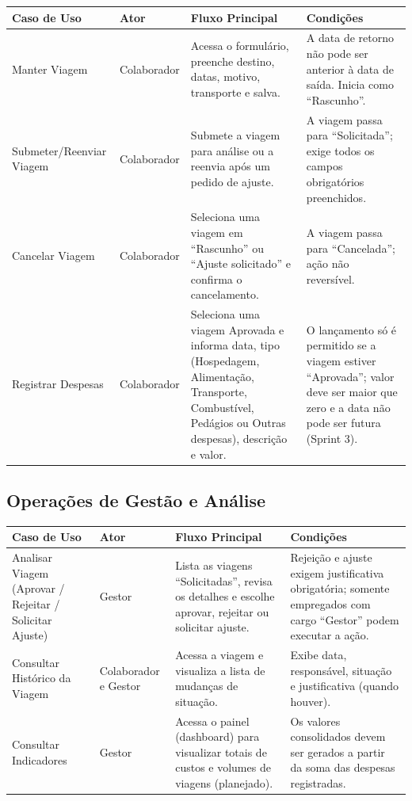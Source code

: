 \documentclass[12pt,article,oneside,a4paper]{abntex2}
\begin{document}
\begin{xltabular}{\textwidth}{|Y|l|Y|Y|}
\hline
{}
\textbf{Caso de Uso} & \textbf{Ator} & \textbf{Fluxo Principal} & \textbf{Condições} \\
\hline
\endhead
Manter Viagem & Colaborador & Acessa o formulário, preenche destino, datas, motivo, transporte e salva. & A data de retorno não pode ser anterior à data de saída. Inicia como ``Rascunho''. \\
\hline
Submeter/Reenviar Viagem & Colaborador & Submete a viagem para análise ou a reenvia após um pedido de ajuste. & A viagem passa para ``Solicitada''; exige todos os campos obrigatórios preenchidos. \\
\hline
Cancelar Viagem & Colaborador & Seleciona uma viagem em ``Rascunho'' ou ``Ajuste solicitado'' e confirma o cancelamento. & A viagem passa para ``Cancelada''; ação não reversível. \\
\hline
Registrar Despesas & Colaborador & Seleciona uma viagem Aprovada e informa data, tipo (Hospedagem, Alimentação, Transporte, Combustível, Pedágios ou Outras despesas), descrição e valor. & O lançamento só é permitido se a viagem estiver ``Aprovada''; valor deve ser maior que zero e a data não pode ser futura (Sprint 3). \\
\hline
\end{xltabular}

\bigskip

\subsection{Operações de Gestão e Análise}

\begin{xltabular}{\textwidth}{|Y|l|Y|Y|}
\hline
{}
\textbf{Caso de Uso} & \textbf{Ator} & \textbf{Fluxo Principal} & \textbf{Condições} \\
\hline
\endhead
Analisar Viagem (Aprovar / Rejeitar / Solicitar Ajuste) & Gestor & Lista as viagens ``Solicitadas'', revisa os detalhes e escolhe aprovar, rejeitar ou solicitar ajuste. & Rejeição e ajuste exigem justificativa obrigatória; somente empregados com cargo ``Gestor'' podem executar a ação. \\
\hline
Consultar Histórico da Viagem & Colaborador e Gestor & Acessa a viagem e visualiza a lista de mudanças de situação. & Exibe data, responsável, situação e justificativa (quando houver). \\
\hline
Consultar Indicadores & Gestor & Acessa o painel (dashboard) para visualizar totais de custos e volumes de viagens (planejado). & Os valores consolidados devem ser gerados a partir da soma das despesas registradas. \\
\hline
\end{xltabular}
\end{document}

